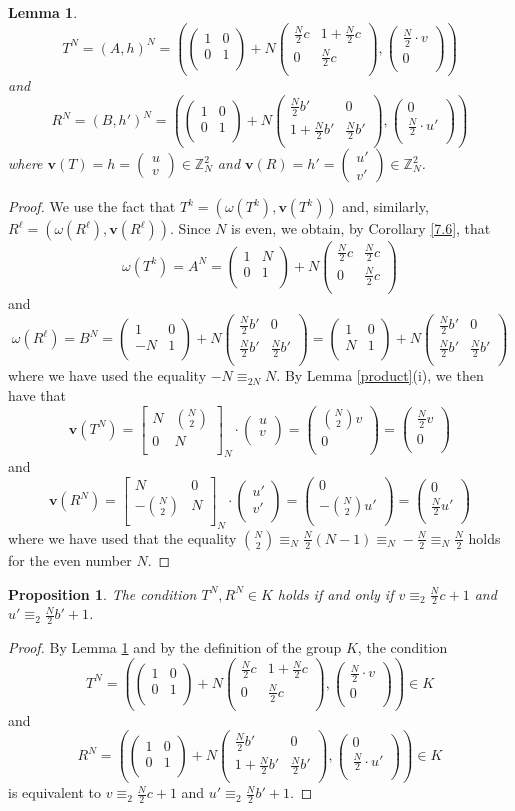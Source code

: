 \documentclass[10pt]{amsart}
\theoremstyle{plain}
\newtheorem{proposition}[theorem]{Proposition}
\newtheorem{lemma}[theorem]{Lemma}
\theoremstyle{definition}
\theoremstyle{remark}%
\newcommand{\Z}{\mathbb{Z}}
\newcommand{\f}{\mathbf{v}}
\newcommand{\g}{\omega}
\newcommand{\mat}[4]{\left(\begin{array}{cc}
 #1 & #2\\
 #3 & #4\\
\end{array}\right)}
\newcommand{\matN}[4]{\left[\begin{array}{cc}
 #1 & #2\\
 #3 & #4\\
\end{array}\right]_N}
\newcommand{\vc}[2]{\left(\begin{array}{c}
 #1 \\
 #2\\
\end{array}\right)}
\begin{document}
\begin{lemma}\label{1}
 $$T^N=(A,h)^N=\left(\mat{1}{0}{0}{1}+N\mat{\frac{N}{2}c}{1+\frac{N}{2}c}{0}{\frac{N}{2}c},\vc{\frac{N}{2}\cdot v}{0}\right)$$
 and
 $$R^N=(B,h')^N=\left(\mat{1}{0}{0}{1}+N\mat{\frac{N}{2}b'}{0}{1+\frac{N}{2}b'}{\frac{N}{2}b'},\vc{0}{\frac{N}{2}\cdot u'}\right)$$
 where $\f(T)=h=\left(\begin{smallmatrix}u\\v\end{smallmatrix}\right)\in\Z_N^2$ and $\f(R)=h'=\left(\begin{smallmatrix}u'\\v'\end{smallmatrix}\right)\in\Z_N^2$.
\end{lemma}
\begin{proof}
We use the fact that $T^{k}=(\g(T^k),\f(T^k))$ and, similarly,  $R^{\ell}=(\g(R^\ell),\f(R^\ell))$.
Since $N$ is even, we obtain, by Corollary \ref{7.6}, that 
$$\g(T^k)=A^N=\mat{1}{N}{0}{1}+N\mat{\frac{N}{2}c}{\frac{N}{2}c}{0}{\frac{N}{2}c}$$ and
$$\g(R^\ell)=B^N=\mat{1}{0}{-N}{1}+N\mat{\frac{N}{2}b'}{0}{\frac{N}{2}b'}{\frac{N}{2}b'}=\mat{1}{0}{N}{1}+N\mat{\frac{N}{2}b'}{0}{\frac{N}{2}b'}{\frac{N}{2}b'}$$
where we have used the equality $-N\equiv_{2N}N$.
By Lemma \ref{product}(i),  we then have that
$$\f(T^N)=\matN{N}{{N\choose 2}}{0}{N}\cdot \vc{u}{v}=\vc{{N\choose 2}v}{0}=\vc{\frac{N}{2}v}{0}$$ and
$$\f(R^N)=\matN{N}{0}{-{N\choose 2}}{N}\cdot \vc{u'}{v'}=\vc{0}{-{N\choose 2}u'}=\vc{0}{\frac{N}{2}u'}$$
where we have used that the equality ${N\choose 2}\equiv_N \frac{N}{2}(N-1)\equiv_N -\frac{N}{2}\equiv_N \frac{N}{2}$ holds for the even number $N$.
\end{proof}






\begin{proposition}\label{2.2}
The condition $T^{N},R^N\in K$ holds if and only if  $v\equiv_2 \frac{N}{2}c+1$ and $u'\equiv_2 \frac{N}{2}b'+1$.
\end{proposition}
\begin{proof}
By  Lemma \ref{1} and by the definition of the group $K$, the condition
$$T^N=\left(\mat{1}{0}{0}{1}+N\mat{\frac{N}{2}c}{1+\frac{N}{2}c}{0}{\frac{N}{2}c},\vc{\frac{N}{2}\cdot v}{0}\right)\in K$$ and 
$$R^N=\left(\mat{1}{0}{0}{1}+N\mat{\frac{N}{2}b'}{0}{1+\frac{N}{2}b'}{\frac{N}{2}b'},\vc{0}{\frac{N}{2}\cdot u'}\right)\in K$$
is equivalent to $v\equiv_2 \frac{N}{2}c+1$ and $u'\equiv_2 \frac{N}{2}b'+1$.
\end{proof}
\end{document}
